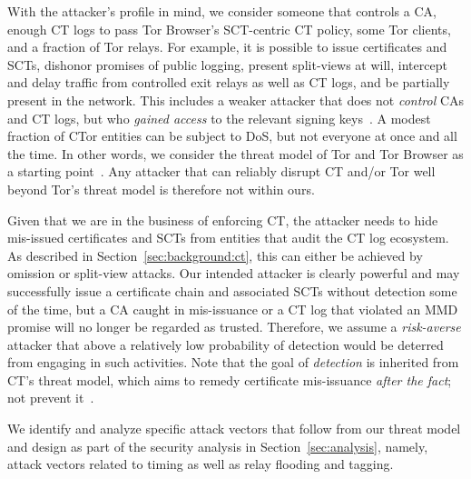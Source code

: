 With
the attacker's profile in mind, we consider someone that controls
	a CA,
	enough CT logs to pass Tor Browser's SCT-centric CT policy, 
	some Tor clients, and
	a fraction of Tor relays.
For example, it is possible to
	issue certificates and SCTs,
	dishonor promises of public logging,
	present split-views at will,
	intercept and delay traffic from controlled exit relays as well as CT logs,
		and
	be partially present in the network.
This includes a weaker attacker that does not \emph{control} CAs and CT logs,
but who \emph{gained access} to the relevant signing keys~\cite{turktrust,%
gdca1-omission}.  A modest fraction of CTor entities can be subject to DoS, but
not everyone at once and all the time.  In other words, we consider the threat
model of Tor and Tor Browser as a starting point~\cite{tor,tor-browser}.  Any
attacker that can reliably disrupt CT and/or Tor well beyond Tor's threat
model is therefore not within ours.

Given that we are in the business of enforcing CT, the attacker needs to hide
mis-issued certificates and SCTs from entities that audit the CT log ecosystem.
As described in Section~\ref{sec:background:ct}, this can either be achieved by
omission or split-view attacks.  Our intended attacker is clearly powerful and
may successfully issue a certificate chain and associated SCTs without detection
some of the time, but a CA caught in mis-issuance or a CT log that violated an
MMD promise will no longer be regarded as trusted.  Therefore, we assume a
\emph{risk-averse} attacker that above a relatively low probability of detection
would be deterred from engaging in such activities. Note that the goal of
\emph{detection} is inherited from CT's threat model, which aims to remedy
certificate mis-issuance \emph{after the fact}; not prevent it~\cite{ct/a}.

We identify and analyze specific attack vectors that follow from our threat
model and design as part of the security analysis in Section~\ref{sec:analysis},
namely, attack vectors related to timing as well as relay flooding and tagging.
